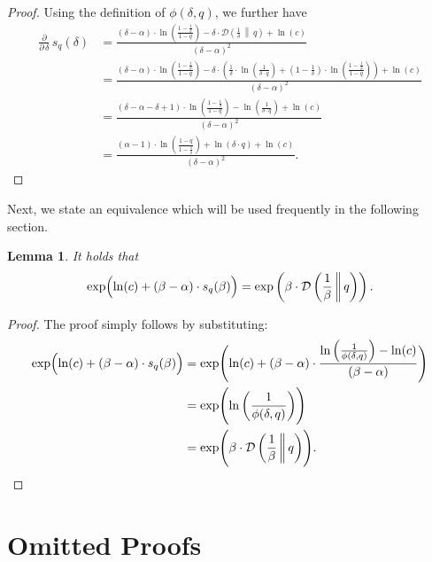 \documentclass[letterpaper,11pt]{article}
\newcommand{\1}[1]{\mathds{1}\left[#1\right]}
\newcommand{\D}[2]{\mathcal{D}\left(#1\, \middle\|\,#2 \right)}
\newtheorem{lemma}[theorem]{Lemma}
\begin{document}
\begin{proof}
	Using the definition of $\phi(\delta,q)$, we further have
	\begin{align*}
		\frac{\partial}{\partial\,\delta}\,s_{q}(\delta) &= \frac{(\delta - \alpha) \cdot \ln\left( \frac{1 - \frac{1}{\delta}}{1 - q} \right) - \delta \cdot \D{\frac{1}{\delta}}{q} + \ln(c)}{(\delta-  \alpha)^{2}}\\
							       &= \frac{(\delta - \alpha) \cdot \ln\left( \frac{1 - \frac{1}{\delta}}{1 - q} \right) - \delta \cdot \left( \frac{1}{\delta} \cdot \ln\left( \frac{1}{\delta \cdot q} \right) + \left( 1 - \frac{1}{\delta} \right)\cdot \ln\left( \frac{1 - \frac{1}{\delta}}{1 - q} \right)   \right)  + \ln(c)}{(\delta-  \alpha)^{2}}\\
							       &= \frac{(\delta - \alpha - \delta + 1) \cdot \ln\left(\frac{ 1 - \frac{1}{\delta} }{1 -q}\right) - \ln\left( \frac{1}{\delta \cdot q} \right)  + \ln(c)}{(\delta - \alpha)^{2}}\\
							       &= \frac{(\alpha - 1) \cdot \ln\left( \frac{1 -q}{1 - \frac{1}{\delta}} \right) + \ln\left( \delta \cdot q \right) + \ln(c)}{(\delta - \alpha)^{2}}.
	\end{align*}
\end{proof}

Next, we state an equivalence which will be used frequently in the following section.

\begin{lemma}\label{lemma:exp_s_substitute}
	It holds that
	\begin{equation*}
		\exp\Bigl( \ln(c) + (\beta - \alpha) \cdot s_{q}(\beta) \Bigr) = \exp\left( \beta \cdot \D{\frac{1}{\beta}}{q} \right).
	\end{equation*}
\end{lemma}

\begin{proof}
	The proof simply follows by substituting:
	\begin{align*}
		\exp\Bigl( \ln(c) + (\beta - \alpha) \cdot s_{q}(\beta) \Bigr) &= \exp\Biggl( \ln(c) + (\beta - \alpha) \cdot \frac{\ln\left( \frac{1}{\phi(\delta,q)} \right) -\ln(c)}{(\beta - \alpha)} \Biggr)\\
											&= \exp\Biggl(\ln\left( \frac{1}{\phi(\delta,q)} \right)\Biggr)\\
											&= \exp\Biggl( \beta \cdot \D{\frac{1}{\beta}}{q} \Biggr).
	\end{align*}
\end{proof}

 
\section{Omitted Proofs}
\label{sec:omitted_proofs}
\end{document}
